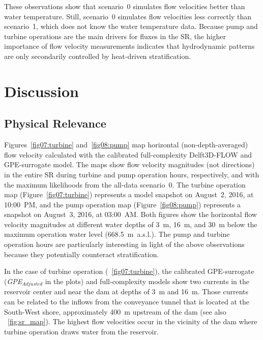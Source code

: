 \documentclass[draft,linenumbers,onecolumn]{agujournal2019} %
\begin{document}
These observations show that scenario~0 simulates flow velocities better than water temperature. Still, scenario~0 simulates flow velocities less correctly than scenario~1, which does not know the water temperature data. Because pump and turbine operations are the main drivers for fluxes in the SR, the higher importance of flow velocity measurements indicates that hydrodynamic patterns are only secondarily controlled by heat-driven stratification.



\section{Discussion}

\subsection{Physical Relevance}

Figures~\ref{fig07:turbine} and~\ref{fig08:pump} map horizontal (non-depth-averaged) flow velocity calculated with the calibrated full-complexity Delft3D-FLOW and GPE-surrogate model. The maps show flow velocity magnitudes (not directions) in the entire SR during turbine and pump operation hours, respectively, and with the maximum likelihoods from the all-data scenario~0. The turbine operation map (Figure~\ref{fig07:turbine}) represents a model snapshot on August~2, 2016, at 10:00~PM, and the pump operation map (Figure~\ref{fig08:pump}) represents a snapshot on August~3, 2016, at 03:00~AM. Both figures show the horizontal flow velocity magnitudes at different water depths of 3~m, 16~m, and 30~m below the maximum operation water level (668.5~m~a.s.l.). The pump and turbine operation hours are particularly interesting in light of the above observations because they potentially counteract stratification. 

In the case of turbine operation (\figurename{~\ref{fig07:turbine}}), the calibrated GPE-surrogate (\textit{GPE$_{Adjusted}$} in the plots) and full-complexity models show two currents in the reservoir center and near the dam at depths of 3~m and 16~m. Those currents can be related to the inflows from the conveyance tunnel that is located at the South-West shore, approximately 400~m upstream of the dam (see also \figurename{~\ref{fig:sr_map}}). The highest flow velocities occur in the vicinity of the dam where turbine operation draws water from the reservoir.
\end{document}

